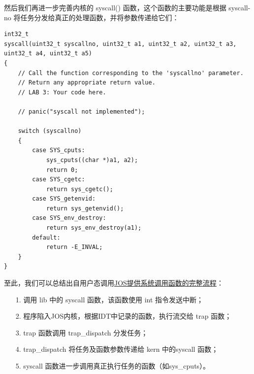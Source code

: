 \documentclass[12pt, letterpaper]{report}
\begin{document}
\newpage
然后我们再进一步完善内核的 syscall() 函数，这个函数的主要功能是根据
syscall-no 将任务分发给真正的处理函数，并将参数传递给它们：\par 
\lstset{style=CStyle}
\setmainfont{Consolas}
\begin{lstlisting}
int32_t
syscall(uint32_t syscallno, uint32_t a1, uint32_t a2, uint32_t a3, uint32_t a4, uint32_t a5)
{
    // Call the function corresponding to the 'syscallno' parameter.
    // Return any appropriate return value.
    // LAB 3: Your code here.

    // panic("syscall not implemented");

    switch (syscallno) 
    {
        case SYS_cputs:
            sys_cputs((char *)a1, a2);
            return 0;
        case SYS_cgetc:
            return sys_cgetc();
        case SYS_getenvid:
            return sys_getenvid();
        case SYS_env_destroy:
            return sys_env_destroy(a1);
        default:
            return -E_INVAL;
    }
}
\end{lstlisting}
\setmainfont{Times New Roman}
至此，我们可以总结出自用户态调用\underline{JOS提供系统调用函数的完整流程}：\par 
\begin{itemize}
    \item[1.] 调用 lib 中的 syscall 函数，该函数使用 int 指令发送中断；\par
    \item[2.] 程序陷入JOS内核，根据IDT中记录的函数，执行流交给 trap 函数；\par
    \item[3.] trap 函数调用 trap\_dispatch 分发任务； \par
    \item[4.] trap\_dispatch 将任务及函数参数传递给 kern 中的syscall 函数；\par
    \item[5.] syscall 函数进一步调用真正执行任务的函数（如sys\_cputs）。\par
\end{itemize}

\newpage
\end{document}

